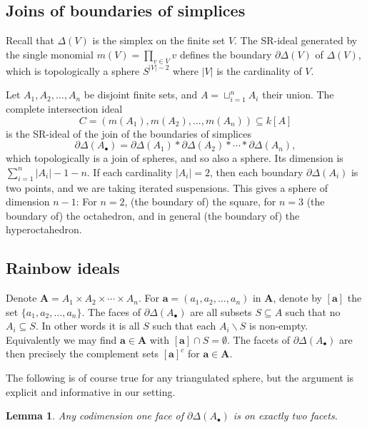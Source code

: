 \documentclass[10pt,a4paper]{article}
\newtheorem{lemm}[cdrthm]{Lemma}
\theoremstyle{definition}
\theoremstyle{remark}
\theoremstyle{plain}
\newcommand{\pd}{\partial}
\newcommand{\vardel}{\partial}
\newcommand{\sus}{\subseteq}
\newcommand{\bfa}{{\mathbf a}}
\newcommand{\Ab}{A_\bullet}
\newcommand{\bfA}{{\mathbf A}}
\newcommand{\Delst}{\vardel \Delta}
\begin{document}
\setcounter{section}{3}\setcounter{subsection}{0}\setcounter{cdrthm}{0}\setcounter{equation}{3}

\subsection{Joins of boundaries of simplices}
Recall that $\Delta(V)$ is the simplex on the finite set $V$. 
The SR-ideal generated by the single monomial $m(V) = \prod_{v \in V} v$
defines the
boundary $\pd \Delta(V)$ of $\Delta(V)$, which is topologically
a sphere $S^{|V|-2}$ where $|V|$ is the cardinality of $V$. 

Let  $A_1, A_2, \ldots, A_n$ be disjoint finite sets, and $A = \sqcup_{i=1}^n A_i$
their union. The complete intersection ideal
\begin{equation*}
  C = (m(A_1), m(A_2), \ldots, m(A_n))  \sus k[A]
\end{equation*}
is the SR-ideal of the join
of the boundaries of simplices
\begin{equation} \label{eq:liaison-join}
  \Delst(\Ab) = \pd \Delta(A_1) * \pd \Delta(A_2) * \cdots * \pd \Delta(A_n),
 \end{equation}
which topologically is a join of spheres, and so also a sphere.
Its dimension is $\sum_{i = 1}^n |A_i| -1-n$. If each cardinality
$|A_i| = 2$, then each boundary $\pd \Delta(A_i)$ is two points,
and we are taking iterated suspensions. This gives a sphere
of dimension $n-1$: For $n = 2$, (the boundary of) the square,
for $n = 3$
(the boundary of) the octahedron, and in general
(the boundary of) the hyperoctahedron.

\subsection{Rainbow ideals}
Denote $\bfA = A_1 \times A_2 \times \cdots \times A_n$.
For $\bfa = (a_1, a_2, \ldots, a_n)$ in $\bfA$, denote
by $[\bfa ]$ the set $\{a_1, a_2, \ldots, a_n \}$. 
The faces of $\Delst(\Ab)$ are all subsets $S \sus A$ such
that no $A_i \sus S$. In other words it is all $S$ such that
each $A_i \backslash S$ is non-empty. Equivalently we 
may find $\bfa \in \bfA$ with $[\bfa] \cap S = \emptyset$.
The facets of $\Delst(\Ab)$ are then precisely
the complement sets $[\bfa]^c$ for $\bfa \in \bfA$.

The following is of course true for any triangulated sphere, but the argument
is explicit and informative in our setting.

\begin{lemm} \label{lem:link-cdto}
  Any codimension one face of $\Delst(\Ab)$ is on exactly two facets.
\end{lemm}
\end{document}
